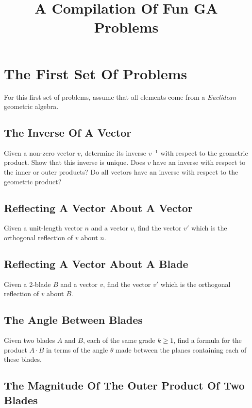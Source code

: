 \documentclass{article}
\title{A Compilation Of Fun GA Problems}
\begin{document}
\maketitle

\section{The First Set Of Problems}

For this first set of problems, assume that all elements
come from a \emph{Euclidean} geometric algebra.

\subsection{The Inverse Of A Vector}

Given a non-zero vector $v$, determine its inverse $v^{-1}$ with respect to the geometric product.
Show that this inverse is unique.  Does $v$ have an inverse with respect to the inner or outer products?
Do all vectors have an inverse with respect to the geometric product?

\subsection{Reflecting A Vector About A Vector}

Given a unit-length vector $n$ and a vector $v$, find the vector $v'$ which is the
orthogonal reflection of $v$ about $n$.

\subsection{Reflecting A Vector About A Blade}

Given a 2-blade $B$ and a vector $v$, find the vector $v'$ which is the orthogonal
reflection of $v$ about $B$.

\subsection{The Angle Between Blades}

Given two blades $A$ and $B$, each of the same grade $k\geq 1$, find a formula for the product $A\cdot B$
in terms of the angle $\theta$ made between the planes containing each of these blades.

\subsection{The Magnitude Of The Outer Product Of Two Blades}
\end{document}
